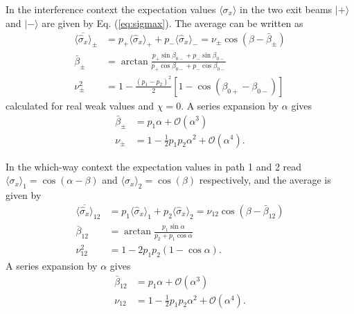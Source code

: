 \documentclass[english,keywords,aps,twocolumn]{revtex4-1}
\begin{document}
In the interference context the expectation values $\langle\sigma_x\rangle$ in the two exit beams $|+\rangle$ and $|-\rangle$ are given by Eq. (\ref{eq:sigmax}). The average can be written as
\begin{subequations}
\begin{alignat}{1}
 \overline{\langle\hat\sigma_x\rangle}_{\pm} &= 
 p_+ \langle\hat\sigma_{x}\rangle_+  + p_-  \langle \hat\sigma_{x}\rangle_- = 
 \nu_{\pm} \cos(\beta - \bar\beta_{\pm}) \label{eq:sxexpectavrg}\\
  \bar\beta_{\pm} &= \arctan \frac{p_+ \sin\beta_{0-} + p_- \sin\beta_{0-}}{p_+ \cos\beta_{0-} + p_- \cos\beta_{0-}} \\
  \nu_{\pm}^2 &=1 - \frac{(p_1-p_2)^2}2 \left[1-\cos(\beta_{0+}-\beta_{0-})\right]
\end{alignat}
\end{subequations}
calculated for real weak values and $\chi=0$. A series expansion by $\alpha$ gives
\begin{subequations}
\begin{alignat}{2}
  \bar\beta_{\pm} &= p_1 \alpha + \mathcal{O}( \alpha^3)  \\
  \nu_{\pm} &= 1 - \frac 1 2 p_1 p_2 \alpha^2 +  \mathcal{O}( \alpha^4).
\end{alignat}
\end{subequations}

In the which-way context the expectation values in path 1 and 2 read $\langle\sigma_x\rangle_1=\cos(\alpha-\beta)$ and $\langle\sigma_x\rangle_2 = \cos(\beta)$ respectively, and the average is given by
\begin{subequations}
\begin{alignat}{1}
 \overline{\langle\hat\sigma_x\rangle}_{12} &=  p_1 \langle\hat\sigma_{x}\rangle_1  + p_2  \langle \hat\sigma_{x}\rangle_2
   = \nu_{12}  \cos(\beta - \bar\beta_{12}) \\
  \bar\beta_{12} &= \arctan \frac{p_1\sin\alpha}{p_2+p_1\cos\alpha} \\
  \nu_{12}^2 &=1- 2 p_1 p_2(1- \cos\alpha).
\end{alignat}
\end{subequations}
A series expansion by $\alpha$ gives
\begin{subequations}
\begin{alignat}{2}
  \bar\beta_{12} &= p_1 \alpha + \mathcal{O}( \alpha^3)
  \\
  \nu_{12} &= 1 - \frac 1 2 p_1 p_2 \alpha^2 +  \mathcal{O}( \alpha^4).
\end{alignat}
\end{subequations}

\pagebreak



\end{document}
